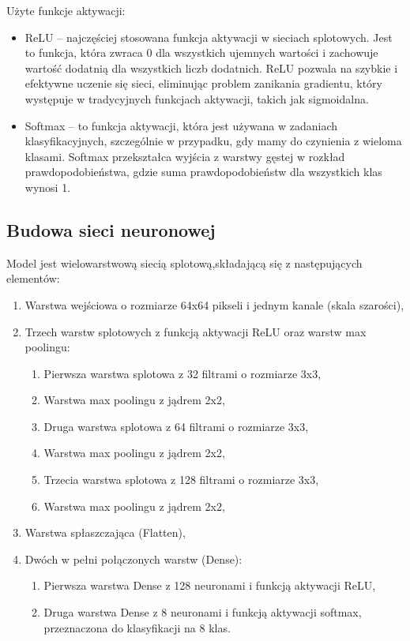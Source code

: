 Użyte funkcje aktywacji:
\begin{itemize}
    \item ReLU -- najczęściej stosowana funkcja aktywacji w sieciach splotowych.
    Jest to funkcja, która zwraca 0 dla wszystkich ujemnych wartości i zachowuje wartość dodatnią dla wszystkich liczb dodatnich.
    ReLU pozwala na szybkie i efektywne uczenie się sieci, eliminując problem zanikania gradientu,
    który występuje w tradycyjnych funkcjach aktywacji, takich jak sigmoidalna.
    \item Softmax -- to funkcja aktywacji, która jest używana w zadaniach klasyfikacyjnych,
    szczególnie w przypadku, gdy mamy do czynienia z wieloma klasami.
    Softmax przekształca wyjścia z warstwy gęstej w rozkład prawdopodobieństwa,
    gdzie suma prawdopodobieństw dla wszystkich klas wynosi 1.
\end{itemize}

\subsection{Budowa sieci neuronowej}\label{subsec:budowa-sieci-neuronowej}

Model jest wielowarstwową siecią splotową,składającą się z następujących elementów:
\begin{enumerate}
    \item Warstwa wejściowa o rozmiarze 64x64 pikseli i jednym kanale (skala szarości),
    \item Trzech warstw splotowych z funkcją aktywacji ReLU oraz warstw max poolingu:
    \begin{enumerate}
        \item Pierwsza warstwa splotowa z 32 filtrami o rozmiarze 3x3,
        \item Warstwa max poolingu z jądrem 2x2,
        \item Druga warstwa splotowa z 64 filtrami o rozmiarze 3x3,
        \item Warstwa max poolingu z jądrem 2x2,
        \item Trzecia warstwa splotowa z 128 filtrami o rozmiarze 3x3,
        \item Warstwa max poolingu z jądrem 2x2,
    \end{enumerate}
    \item Warstwa spłaszczająca (Flatten),
    \item Dwóch w pełni połączonych warstw (Dense):
    \begin{enumerate}
        \item Pierwsza warstwa Dense z 128 neuronami i funkcją aktywacji ReLU,
        \item Druga warstwa Dense z 8 neuronami i funkcją aktywacji softmax, przeznaczona do klasyfikacji na 8 klas.
    \end{enumerate}
\end{enumerate}

